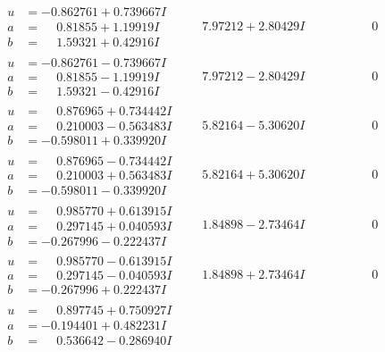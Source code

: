 \documentclass[1p]{elsarticle_modified}
\theoremstyle{definition}
\begin{document}
$$\begin{array}{c|c|c}
\begin{aligned}
u &= -0.862761 + 0.739667 I \\
a &= \phantom{-}0.81855 + 1.19919 I \\
b &= \phantom{-}1.59321 + 0.42916 I\end{aligned}
 & \phantom{-}7.97212 + 2.80429 I & \phantom{-0.000000 } 0 \\ \hline\begin{aligned}
u &= -0.862761 - 0.739667 I \\
a &= \phantom{-}0.81855 - 1.19919 I \\
b &= \phantom{-}1.59321 - 0.42916 I\end{aligned}
 & \phantom{-}7.97212 - 2.80429 I & \phantom{-0.000000 } 0 \\ \hline\begin{aligned}
u &= \phantom{-}0.876965 + 0.734442 I \\
a &= \phantom{-}0.210003 - 0.563483 I \\
b &= -0.598011 + 0.339920 I\end{aligned}
 & \phantom{-}5.82164 - 5.30620 I & \phantom{-0.000000 } 0 \\ \hline\begin{aligned}
u &= \phantom{-}0.876965 - 0.734442 I \\
a &= \phantom{-}0.210003 + 0.563483 I \\
b &= -0.598011 - 0.339920 I\end{aligned}
 & \phantom{-}5.82164 + 5.30620 I & \phantom{-0.000000 } 0 \\ \hline\begin{aligned}
u &= \phantom{-}0.985770 + 0.613915 I \\
a &= \phantom{-}0.297145 + 0.040593 I \\
b &= -0.267996 - 0.222437 I\end{aligned}
 & \phantom{-}1.84898 - 2.73464 I & \phantom{-0.000000 } 0 \\ \hline\begin{aligned}
u &= \phantom{-}0.985770 - 0.613915 I \\
a &= \phantom{-}0.297145 - 0.040593 I \\
b &= -0.267996 + 0.222437 I\end{aligned}
 & \phantom{-}1.84898 + 2.73464 I & \phantom{-0.000000 } 0 \\ \hline\begin{aligned}
u &= \phantom{-}0.897745 + 0.750927 I \\
a &= -0.194401 + 0.482231 I \\
b &= \phantom{-}0.536642 - 0.286940 I\end{aligned}

\end{array}$$
\end{document}
